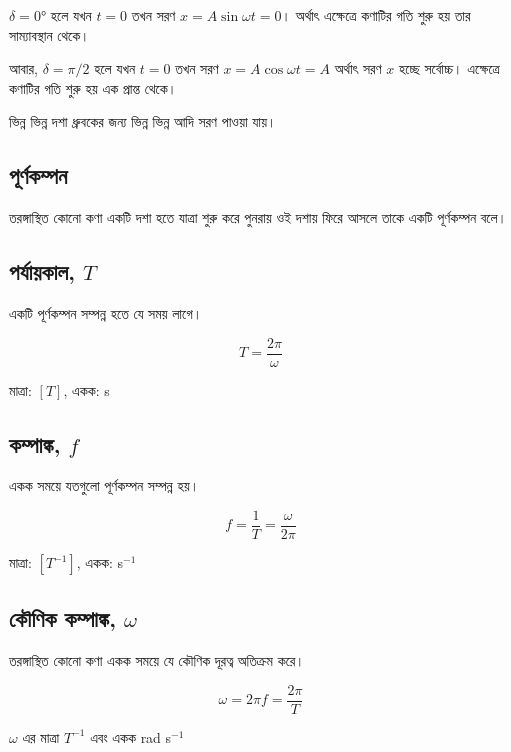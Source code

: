 $\delta = 0°$ হলে যখন $t = 0$ তখন সরণ $x = A \sin \omega t = 0$। অর্থাৎ এক্ষেত্রে কণাটির গতি শুরু হয় তার সাম্যাবস্থান থেকে।

আবার, $\delta = \pi/2$ হলে যখন $t = 0$ তখন সরণ $x = A \cos \omega t = A$ অর্থাৎ সরণ $x$ হচ্ছে সর্বোচ্চ। এক্ষেত্রে কণাটির গতি শুরু হয় এক প্রান্ত থেকে।

ভিন্ন ভিন্ন দশা ধ্রুবকের জন্য ভিন্ন ভিন্ন আদি সরণ পাওয়া যায়।

\subsection{পূর্ণকম্পন}

তরঙ্গাস্থিত কোনো কণা একটি দশা হতে যাত্রা শুরু করে পুনরায় ওই দশায় ফিরে আসলে তাকে একটি পূর্ণকম্পন বলে।

\subsection{পর্যায়কাল, $T$}

একটি পূর্ণকম্পন সম্পন্ন হতে যে সময় লাগে।

\begin{equation}
    T = \frac{2\pi}{\omega}
\end{equation}

মাত্রা: $[T]$, একক: \textenglish{s}

\subsection{কম্পাঙ্ক, $f$}

একক সময়ে যতগুলো পূর্ণকম্পন সম্পন্ন হয়।

\begin{equation}
    f = \frac{1}{T} = \frac{\omega}{2\pi}
\end{equation}

মাত্রা: $[T^{-1}]$, একক: \textenglish{s}$^{-1}$

\subsection{কৌণিক কম্পাঙ্ক, $\omega$}

তরঙ্গাস্থিত কোনো কণা একক সময়ে যে কৌণিক দূরত্ব অতিক্রম করে।

\begin{equation}
    \omega = 2\pi f = \frac{2\pi}{T}
\end{equation}

$\omega$ এর মাত্রা $T^{-1}$ এবং একক \textenglish{rad s}$^{-1}$


